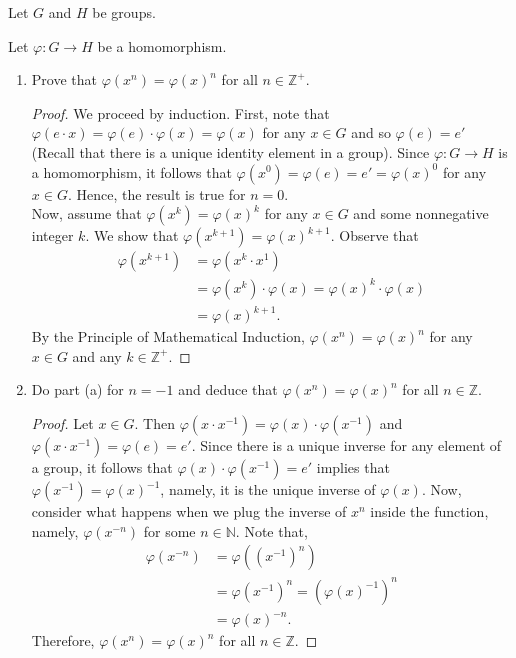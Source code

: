 \documentclass[12pt]{article}
\newcommand{\N}{\mathbb{N}}
\newcommand{\Z}{\mathbb{Z}}
\newenvironment{problem}[2][Problem]{\begin{trivlist} \item[\hskip \labelsep {\bfseries #1}\hskip \labelsep {\bfseries #2.}]}{\end{trivlist}}
\begin{document}
Let $G$ and $H$ be groups.
\begin{problem}{1}
 Let $\varphi:G\to H$ be a homomorphism.
\begin{enumerate}
  \item Prove that $\varphi(x^{n})=\varphi(x)^{n}$ for all $n\in \Z^{+}$.
\begin{proof}
  We proceed by induction. First, note that $\varphi(e\cdot x) = \varphi(e)\cdot \varphi(x) = \varphi(x)$ for any $x\in G$ and so $\varphi(e)=e'$ (Recall that there is a unique identity element in a group). Since $\varphi:G\to H$ is a homomorphism, it follows that $\varphi(x^{0}) = \varphi(e) = e' = \varphi(x)^{0}$ for any $x\in G$. Hence, the result is true for $n=0$. \\

  Now, assume that $\varphi(x^{k}) = \varphi(x)^{k}$ for any $x\in G$ and some nonnegative integer $k$. We show that $\varphi(x^{k+1}) = \varphi(x)^{k+1}$. Observe that
\begin{align*}
  \varphi(x^{k+1}) &= \varphi(x^{k}\cdot x^{1})\\
  &= \varphi(x^{k})\cdot \varphi(x) = \varphi(x)^{k}\cdot \varphi(x)\\
  &= \varphi(x)^{k+1}.
\end{align*}
By the Principle of Mathematical Induction, $\varphi(x^{n})=\varphi(x)^{n}$ for any $x\in G$ and any $k\in \Z^{+}$.
\end{proof}
  \item Do part (a) for $n=-1$ and deduce that $\varphi(x^{n})=\varphi(x)^{n}$ for all $n\in \Z$.
\begin{proof}
  Let $x\in G$. Then $\varphi(x\cdot x^{-1}) = \varphi(x)\cdot \varphi(x^{-1})$ and $\varphi(x\cdot x^{-1})=\varphi(e) = e'$. Since there is a unique inverse for any element of a group, it follows that $\varphi(x)\cdot \varphi(x^{-1})=e'$ implies that $\varphi(x^{-1})=\varphi(x)^{-1}$, namely, it is the unique inverse of $\varphi(x)$. Now, consider what happens when we plug the inverse of $x^{n}$ inside the function, namely, $\varphi(x^{-n})$ for some $n\in \N$. Note that,
\begin{align*}
  \varphi\left( x^{-n} \right) &= \varphi\left( \left(x^{-1}\right)^{n} \right) \\
  &= \varphi\left( x^{-1} \right) ^{n} = \left( \varphi(x)^{-1} \right)^{n} \\
  &= \varphi(x)^{-n}.
\end{align*}
Therefore, $\varphi(x^{n}) = \varphi(x)^{n}$ for all $n\in\Z$.
\end{proof}
\end{enumerate}
\end{problem}
\end{document}
